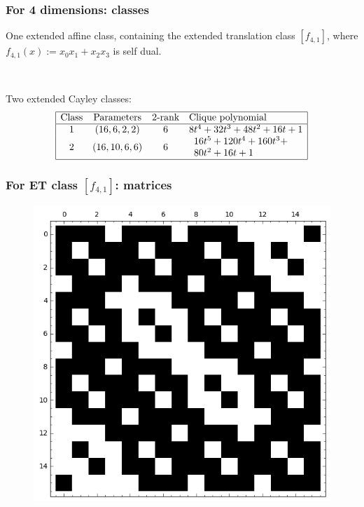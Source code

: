 \documentclass[pdf,sprung,slideColor,nocolorBG]{beamer}
\newenvironment{colortheme}[1]{
\def\ProvidesPackageRCS $##1${\relax}
\renewcommand{\ProcessOptions}{\relax}
\makeatletter

\makeatother
}{}
\begin{document}
\begin{colortheme}{jubata}
\begin{frame}
\begin{figure}
\begin{minipage}{.48\textwidth}
  \label{fig:c2_1_bent_cayley_graph_index_matrix}
\end{minipage}
\end{figure}
\end{frame}
\begin{frame}
\frametitle{For 4 dimensions: classes}

One extended affine class, containing the extended translation class $[f_{4,1}]$, where
$f_{4,1}(x) := x_0 x_1 + x_2 x_3$ is self dual.

~

Two extended Cayley classes:
\begin{align*}
\begin{array}{|cccl|}
\hline
\text{Class} &
\text{Parameters} &
\text{2-rank} &
\text{Clique polynomial}
\\
\hline
1 &
(16, 6, 2, 2) &
6 &
8t^{4} + 32t^{3} + 48t^{2} + 16t + 1
\\
2 &
(16, 10, 6, 6) &
6 &
\begin{array}{l}
16t^{5} + 120t^{4} + 160t^{3} +
\\
80t^{2} + 16t + 1
\end{array}
\\
\hline
\end{array}
\end{align*}
\end{frame}
\begin{frame}
\frametitle{For ET class $[f_{4,1}]$: matrices}
\begin{figure}
\centering
\begin{minipage}{.48\textwidth}
  \centering
  \includegraphics[width=.9\linewidth]{../matrix_plot/re4_1_weight_class_matrix.png}

\end{minipage}
\end{figure}
\end{frame}
\end{colortheme}
\end{document}
